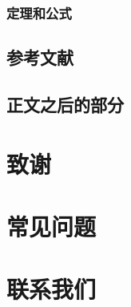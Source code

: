 \documentclass[doctor,openright]{buaathesis}
\begin{document}
		\subsection{定理和公式}
	\newpage
	\section{参考文献}
	\section{正文之后的部分}
	
\chapter{致谢}
\cleardoublepage
%

\appendix


\chapter{常见问题}

\chapter{联系我们}
\end{document}
